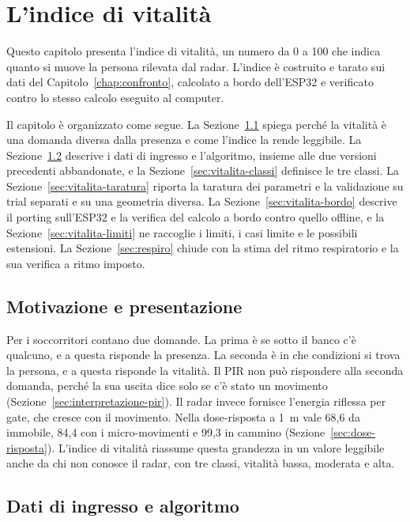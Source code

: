 \chapter{L'indice di vitalità}
\label{chap:vitalita}

Questo capitolo presenta l'indice di vitalità, un numero da 0 a 100 che indica quanto si muove la persona rilevata dal radar. L'indice è costruito e tarato sui dati del Capitolo~\ref{chap:confronto}, calcolato a bordo dell'ESP32 e verificato contro lo stesso calcolo eseguito al computer.

Il capitolo è organizzato come segue. La Sezione~\ref{sec:vitalita-motivazione} spiega perché la vitalità è una domanda diversa dalla presenza e come l'indice la rende leggibile. La Sezione~\ref{sec:vitalita-ingressi} descrive i dati di ingresso e l'algoritmo, insieme alle due versioni precedenti abbandonate, e la Sezione~\ref{sec:vitalita-classi} definisce le tre classi. La Sezione~\ref{sec:vitalita-taratura} riporta la taratura dei parametri e la validazione su trial separati e su una geometria diversa. La Sezione~\ref{sec:vitalita-bordo} descrive il porting sull'ESP32 e la verifica del calcolo a bordo contro quello offline, e la Sezione~\ref{sec:vitalita-limiti} ne raccoglie i limiti, i casi limite e le possibili estensioni. La Sezione~\ref{sec:respiro} chiude con la stima del ritmo respiratorio e la sua verifica a ritmo imposto.

\section{Motivazione e presentazione}
\label{sec:vitalita-motivazione}
\label{sec:vitalita-presentazione}

Per i soccorritori contano due domande. La prima è se sotto il banco c'è qualcuno, e a questa risponde la presenza. La seconda è in che condizioni si trova la persona, e a questa risponde la vitalità. Il PIR non può rispondere alla seconda domanda, perché la sua uscita dice solo se c'è stato un movimento (Sezione~\ref{sec:interpretazione-pir}). Il radar invece fornisce l'energia riflessa per gate, che cresce con il movimento. Nella dose-risposta a 1~m vale 68,6 da immobile, 84,4 con i micro-movimenti e 99,3 in cammino (Sezione~\ref{sec:dose-risposta}). L'indice di vitalità riassume questa grandezza in un valore leggibile anche da chi non conosce il radar, con tre classi, vitalità bassa, moderata e alta.

\section{Dati di ingresso e algoritmo}
\label{sec:vitalita-ingressi}
\label{sec:vitalita-algoritmo}


